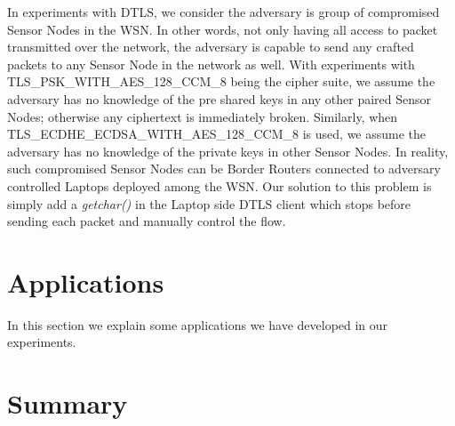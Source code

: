 In experiments with DTLS, we consider the adversary is group of compromised Sensor Nodes in the WSN. In other words, not only having all access to packet transmitted over the network, the adversary is capable to send any crafted packets to any Sensor Node in the network as well. With experiments with TLS\_PSK\_WITH\_AES\_128\_CCM\_8 being the cipher suite, we assume the adversary has no knowledge of the pre shared keys in any other paired Sensor Nodes; otherwise any ciphertext is immediately broken. Similarly, when TLS\_ECDHE\_ECDSA\_WITH\_AES\_128\_CCM\_8 is used, we assume the adversary has no knowledge of the private keys in other Sensor Nodes. In reality, such compromised Sensor Nodes can be Border Routers connected to adversary controlled Laptops deployed among the WSN. Our solution to this problem is simply add a \textit{getchar()} in the Laptop side DTLS client which stops before sending each packet and manually control the flow.

\section{Applications}

In this section we explain some applications we have developed in our experiments.









\section{Summary}



